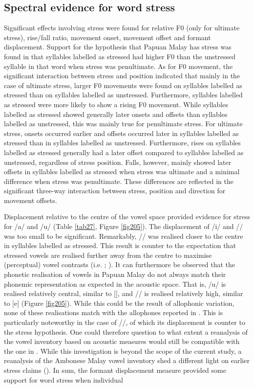 \subsection{Spectral evidence for word stress}
Significant effects involving stress were found for relative F0 (only for ultimate stress), rise/fall ratio, movement onset, movement offset and formant displacement. Support for the hypothesis that Papuan Malay has stress was found in that syllables labelled as stressed had higher F0 than the unstressed syllable in that word when stress was penultimate. As for F0 movement, the significant interaction between stress and position indicated that mainly in the case of ultimate stress, larger F0 movements were found on syllables labelled as stressed than on syllables labelled as unstressed. Furthermore, syllables labelled as stressed were more likely to show a rising F0 movement. While syllables labelled as stressed showed generally later onsets and offsets than syllables labelled as unstressed, this was mainly true for penultimate stress. For ultimate stress, onsets occurred earlier and offsets occurred later in syllables labelled as stressed than in syllables labelled as unstressed. Furthermore, rises on syllables labelled as stressed generally had a later offset compared to syllables labelled as unstressed, regardless of stress position. Falls, however, mainly showed later offsets in syllables labelled as stressed when stress was ultimate and a minimal difference when stress was penultimate. These differences are reflected in the significant three-way interaction between stress, position and direction for movement offsets.\par Displacement relative to the centre of the vowel space provided evidence for stress for /a/ and /u/ (Table \ref{tab27}, Figure \ref{fig205}). The displacement of /i/ and // was too small to be significant. Remarkably, // was realised closer to the centre in syllables labelled as stressed. This result is counter to the expectation that stressed vowels are realised further away from the centre to maximise (perceptual) vowel contrasts (i.e. \citealt{liljencrants_numerical_1972}; \citealt{flemming_contrast_2004}). It can furthermore be observed that the phonetic realisation of vowels in Papuan Malay do not always match their phonemic representation as expected in the acoustic space. That is, /u/ is realised relatively central, similar to [], and // is realised relatively high, similar to [e] (Figure \ref{fig205}). While this could be the result of allophonic variation, none of these realisations match with the allophones reported in \citet{kluge_grammar_2017}. This is particularly noteworthy in the case of //, of which its displacement is counter to the stress hypothesis. One could therefore question to what extent a reanalysis of the vowel inventory based on acoustic measures would still be compatible with the one in \citet{kluge_grammar_2017}. While this investigation is beyond the scope of the current study, a reanalysis of the Ambonese Malay vowel inventory shed a different light on earlier stress claims (\citealt{maskikit-essed_no_2016}). In sum, the formant displacement measure provided some support for word stress when individual 